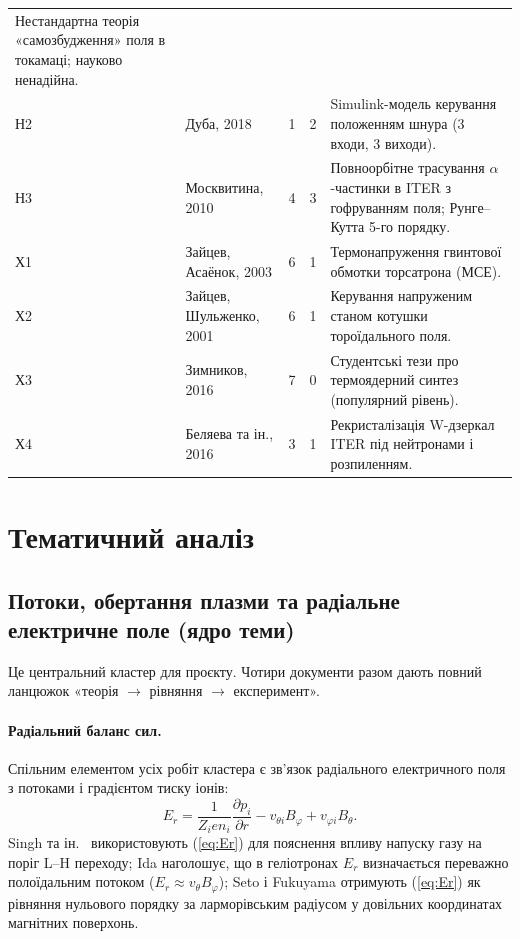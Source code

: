 \documentclass[11pt,a4paper]{article}
\begin{document}
\begin{longtable}{@{}p{0.9cm}>{\raggedright\arraybackslash}p{4.3cm}p{0.6cm}p{0.5cm}>{\raggedright\arraybackslash}p{8.6cm}@{}}
  Нестандартна теорія «самозбудження» поля в токамаці; науково ненадійна. \\
Н2 & Дуба, 2018 \cite{Duba2018} & 1 & 2 &
  Simulink-модель керування положенням шнура (3 входи, 3 виходи). \\
Н3 & Москвитина, 2010 \cite{Moskvitina2010} & 4 & 3 &
  Повноорбітне трасування $\alpha$-частинки в ITER з гофруванням поля; Рунге--Кутта 5-го порядку. \\
Х1 & Зайцев, Асаёнок, 2003 \cite{Zaitsev2003} & 6 & 1 &
  Термонапруження гвинтової обмотки торсатрона (МСЕ). \\
Х2 & Зайцев, Шульженко, 2001 \cite{Zaitsev2001} & 6 & 1 &
  Керування напруженим станом котушки тороїдального поля. \\
Х3 & Зимников, 2016 \cite{Zimnikov2016} & 7 & 0 &
  Студентські тези про термоядерний синтез (популярний рівень). \\
Х4 & Беляева та ін., 2016 \cite{Belyaeva2016} & 3 & 1 &
  Рекристалізація W-дзеркал ITER під нейтронами і розпиленням. \\
\end{longtable}

\section{Тематичний аналіз}

\subsection{Потоки, обертання плазми та радіальне електричне поле (ядро теми)}

Це центральний кластер для проєкту. Чотири документи
\cite{Singh2004,Sigmar1987,Seto2014,Ida2001} разом дають повний ланцюжок
«теорія $\to$ рівняння $\to$ експеримент».

\paragraph{Радіальний баланс сил.} Спільним елементом усіх робіт кластера є
зв'язок радіального електричного поля з потоками і градієнтом тиску іонів:
\begin{equation}\label{eq:Er}
  E_r=\frac{1}{Z_i e n_i}\frac{\partial p_i}{\partial r}-v_{\theta i}B_\varphi+v_{\varphi i}B_\theta .
\end{equation}
Singh та ін.\ \cite{Singh2004} використовують (\ref{eq:Er}) для пояснення впливу
напуску газу на поріг L--H переходу; Ida \cite{Ida2001} наголошує, що в геліотронах
$E_r$ визначається переважно полоїдальним потоком ($E_r\approx v_\theta B_\varphi$);
Seto і Fukuyama \cite{Seto2014} отримують (\ref{eq:Er}) як рівняння нульового порядку
за ларморівським радіусом у довільних координатах магнітних поверхонь.
\end{document}
